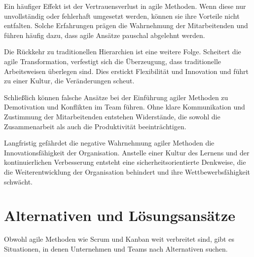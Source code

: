 \documentclass[ngerman]{seminarvorlage}
\begin{document}
Ein häufiger Effekt ist der Vertrauensverlust in agile Methoden. Wenn diese nur unvollständig oder fehlerhaft umgesetzt werden, können sie ihre Vorteile nicht entfalten. Solche Erfahrungen prägen die Wahrnehmung der Mitarbeitenden und führen häufig dazu, dass agile Ansätze pauschal abgelehnt werden.

Die Rückkehr zu traditionellen Hierarchien ist eine weitere Folge. Scheitert die agile Transformation, verfestigt sich die Überzeugung, dass traditionelle Arbeitsweisen überlegen sind. Dies erstickt Flexibilität und Innovation und führt zu einer Kultur, die Veränderungen scheut.

Schließlich können falsche Ansätze bei der Einführung agiler Methoden zu Demotivation und Konflikten im Team führen. Ohne klare Kommunikation und Zustimmung der Mitarbeitenden entstehen Widerstände, die sowohl die Zusammenarbeit als auch die Produktivität beeinträchtigen.

Langfristig gefährdet die negative Wahrnehmung agiler Methoden die Innovationsfähigkeit der Organisation. Anstelle einer Kultur des Lernens und der kontinuierlichen Verbesserung entsteht eine sicherheitsorientierte Denkweise, die die Weiterentwicklung der Organisation behindert und ihre Wettbewerbsfähigkeit schwächt.
\cite{stawicki_10_2021}


\section{Alternativen und Lösungsansätze}
Obwohl agile Methoden wie Scrum und Kanban weit verbreitet sind, gibt es Situationen, in denen Unternehmen und Teams nach Alternativen suchen. 



\end{document}
